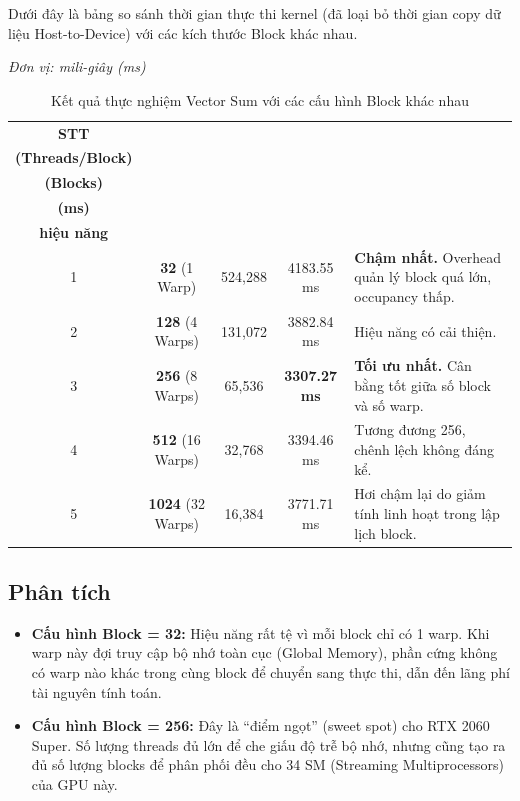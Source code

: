 \documentclass{article}
\begin{document}
    Dưới đây là bảng so sánh thời gian thực thi kernel (đã loại bỏ thời gian copy dữ liệu Host-to-Device) với các kích thước Block khác nhau.

    \textit{Đơn vị: mili-giây (ms)}

    \begin{table}[h!]
    \centering
    \small
    \begin{tabular}{ccccp{6cm}}
    \toprule
    \textbf{STT} & \makecell{\textbf{Cấu hình} \\ \textbf{(Threads/Block)}} & \makecell{\textbf{Grid Size} \\ \textbf{(Blocks)}} & \makecell{\textbf{Thời gian Kernel} \\ \textbf{(ms)}} & \makecell{\textbf{Nhận xét} \\ \textbf{hiệu năng}} \\
    \midrule
    1 & \textbf{32} (1 Warp) & 524,288 & 4183.55 ms & \textbf{Chậm nhất.} Overhead quản lý block quá lớn, occupancy thấp. \\
    2 & \textbf{128} (4 Warps) & 131,072 & 3882.84 ms & Hiệu năng có cải thiện. \\
    3 & \textbf{256} (8 Warps) & 65,536 & \textbf{3307.27 ms} & \textbf{Tối ưu nhất.} Cân bằng tốt giữa số block và số warp. \\
    4 & \textbf{512} (16 Warps) & 32,768 & 3394.46 ms & Tương đương 256, chênh lệch không đáng kể. \\
    5 & \textbf{1024} (32 Warps) & 16,384 & 3771.71 ms & Hơi chậm lại do giảm tính linh hoạt trong lập lịch block. \\
    \bottomrule
    \end{tabular}
    \caption{Kết quả thực nghiệm Vector Sum với các cấu hình Block khác nhau}
    \end{table}

    \subsection{Phân tích}

    \begin{itemize}
        \item \textbf{Cấu hình Block = 32:} Hiệu năng rất tệ vì mỗi block chỉ có 1 warp. Khi warp này đợi truy cập bộ nhớ toàn cục (Global Memory), phần cứng không có warp nào khác trong cùng block để chuyển sang thực thi, dẫn đến lãng phí tài nguyên tính toán.
        \item \textbf{Cấu hình Block = 256:} Đây là ``điểm ngọt'' (sweet spot) cho RTX 2060 Super. Số lượng threads đủ lớn để che giấu độ trễ bộ nhớ, nhưng cũng tạo ra đủ số lượng blocks để phân phối đều cho 34 SM (Streaming Multiprocessors) của GPU này.
    \end{itemize}
\end{document}
